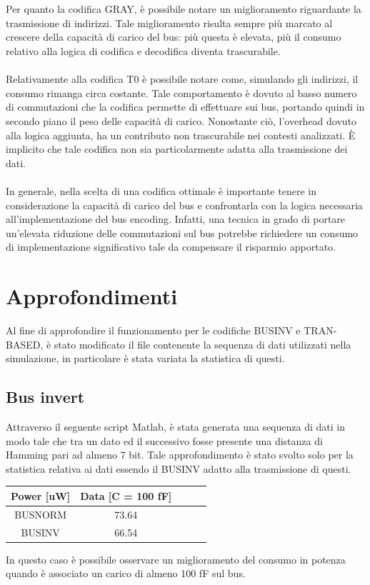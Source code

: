 \documentclass[11pt,  english, makeidx, a4paper, titlepage, oneside]{book}
\newenvironment{listato}{\footnotesize} {\normalsize }
\begin{document}
\\\\
Per quanto la codifica GRAY, è possibile notare un miglioramento riguardante la trasmissione di indirizzi. Tale miglioramento risulta sempre più marcato al crescere della capacità di carico del bus: più questa è elevata, più il consumo relativo alla logica di codifica e decodifica diventa trascurabile.
\\\\
Relativamente alla codifica T0 è possibile notare come, simulando gli indirizzi, il consumo rimanga circa costante. Tale comportamento è dovuto al basso numero di commutazioni che la codifica permette di effettuare sui bus, portando quindi in secondo piano il peso delle capacità di carico. Nonostante ciò, l'overhead dovuto alla logica aggiunta, ha un contributo non trascurabile nei contesti analizzati. È implicito che tale codifica non sia particolarmente adatta alla trasmissione dei dati.
\\\\
In generale, nella scelta di una codifica ottimale è importante tenere in considerazione la capacità di carico del bus e confrontarla con la logica necessaria all'implementazione del bus encoding. Infatti, una tecnica in grado di portare un'elevata riduzione delle commutazioni sul bus potrebbe richiedere un consumo di implementazione significativo tale da compensare il risparmio apportato.
\newpage
\section{Approfondimenti}
Al fine di approfondire il funzionamento per le codifiche BUSINV e TRAN-BASED, è stato modificato il file contenente la sequenza di dati utilizzati nella simulazione, in particolare è stata variata la statistica di questi.
\subsection{Bus invert}
Attraverso il seguente script Matlab, è stata generata una sequenza di dati in modo tale che tra un dato ed il successivo fosse presente una distanza di Hamming pari ad almeno 7 bit. Tale approfondimento è stato svolto solo per la statistica relativa ai dati essendo il BUSINV adatto alla trasmissione di questi.
\begin{center}
\begin{listato}
	\centerline{}
\end{listato}
\end{center}
\begin{center}
	\begin{tabular}{|c|c|c|c|c|}
	\hline
	Power [uW] & Data [C = 100 fF]\\
	\hline
	BUSNORM & 73.64\\
	 \hline
	BUSINV & 66.54\\
	\hline
	\end{tabular}	
\end{center}
\vspace{0.3cm}
In questo caso è possibile osservare un miglioramento del consumo in potenza quando è associato un carico di almeno 100 fF sul bus.
\newpage
\end{document}
